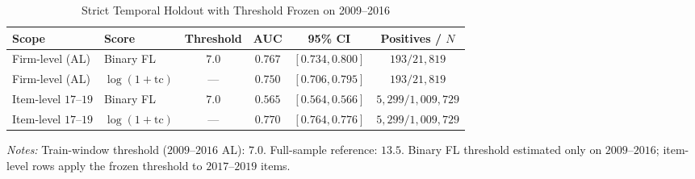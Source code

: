 \begin{table}[htbp]
\centering
\caption{Strict Temporal Holdout with Threshold Frozen on 2009--2016}
\label{tab:strict_train_threshold}
\small
\begin{tabular}{llcccc}
\toprule
Scope & Score & Threshold & AUC & 95\% CI & Positives / $N$ \\
\midrule
Firm-level (AL) & Binary FL & $7.0$ & $0.767$ & $[0.734, 0.800]$ & $193 / 21{,}819$ \\
Firm-level (AL) & $\log(1+\text{tc})$ & --- & $0.750$ & $[0.706, 0.795]$ & $193 / 21{,}819$ \\
Item-level $17$--$19$ & Binary FL & $7.0$ & $0.565$ & $[0.564, 0.566]$ & $5{,}299 / 1{,}009{,}729$ \\
Item-level $17$--$19$ & $\log(1+\text{tc})$ & --- & $0.770$ & $[0.764, 0.776]$ & $5{,}299 / 1{,}009{,}729$ \\
\bottomrule
\end{tabular}

\smallskip
{\footnotesize\textit{Notes:} Train-window threshold ($2009$--$2016$ AL): $7.0$. Full-sample reference: $13.5$. Binary FL threshold estimated only on $2009$--$2016$; item-level rows apply the frozen threshold to $2017$--$2019$ items.\par}
\end{table}
